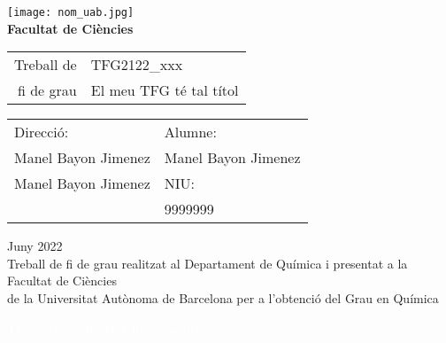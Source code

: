 \documentclass[11pt]{article}
\newcommand\NomComplet{Manel Bayon Jimenez}
\newcommand\NIU{9999999}
\newcommand\NomProfeA{Manel Bayon Jimenez}
\newcommand\NomProfeB{Manel Bayon Jimenez}
\newcommand\CodiTFG{TFG2122\_xxx}
\newcommand\TitolTFG{El meu TFG té tal títol}
\newcommand\NomCentre{Departament de Química } %
\newcommand\NomGrau{Química}
\newcommand\Mes{Juny } %
\newcommand\Any{2022}
\begin{document}
\begin{titlepage}

\center %


\texttt{[image: nom\_uab.jpg]}\\[1.76cm] %


\textbf{\LARGE Facultat de Ciències}\\[3.53cm] %
\begin{flushright}
\begin{tabular}{r | p{}}
  {\Large Treball de} & {\LARGE \CodiTFG}\\
  {\LARGE fi de grau}  & {\LARGE \TitolTFG}
\end{tabular}
\end{flushright}\vspace{7.06cm}




\begin{tabular}{p{} p{}}
\large
Direcció: & Alumne: \\
\NomProfeA & \NomComplet\\
\NomProfeB & NIU: \\
 & \NIU
\end{tabular}
\vspace{0.7cm}



{\large \Mes \Any}\\[1.4cm] %

Treball de fi de grau realitzat al \NomCentre i presentat a la\\ Facultat de Ciències\\ de la Universitat Autònoma de Barcelona per a l'obtenció del Grau en \NomGrau


\end{titlepage}
\restoregeometry
{}
\thispagestyle{empty}
{\centering \textcolor{white}{This page is left blank intentionally}}
\setcounter{page}{0}
\newpage
\end{document}
